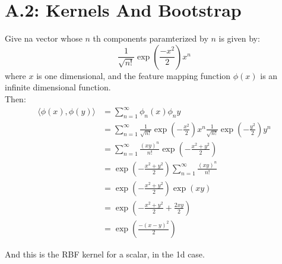 \documentclass[]{article}
\begin{document}
\section*{A.2: Kernels And Bootstrap}
    Give na vector whose $n$ th components paramterized by $n$ is given by: 
    $$
        \frac{1}{\sqrt{n!}}\exp \left(
            \frac{-x^2}{2}
        \right)x^n
    $$
    where $x$ is one dimensional, and the feature mapping function $\phi(x)$ is an infinite dimensional function. 
    \\
    Then: 
    \begin{align*}\tag{A.2.1}\label{eqn:A.2.1}
        \langle \phi(x), \phi(y)\rangle &= 
        \sum_{n = 1}^{\infty}
            \phi_n(x)\phi_n{y}
        \\
        &= 
        \sum_{n = 1}^{\infty}
            \frac{1}{\sqrt{n!}} 
            \exp \left(
                -\frac{x^2}{2}
            \right)x^n
            \frac{1}{\sqrt{n!}} 
            \exp \left(
                -\frac{y^2}{2}
            \right)y^n
        \\
        &= 
        \sum_{n = 1}^{\infty}
            \frac{(xy)^n}{n!}\exp\left(
                -\frac{x^2 + y^2}{2}
            \right)
        \\
        &= 
        \exp\left(
                -\frac{x^2 + y^2}{2}
            \right)
        \sum_{n = 1}^{\infty}
        \frac{(xy)^n}{n!}
        \\
        &= 
        \exp\left(
            - \frac{x^ 2 + y^ 2}{2}
        \right)
        \exp\left(
            xy
        \right)
        \\
        &= 
        \exp\left(
            - \frac{x^ 2 + y^ 2}{2} + \frac{2xy}{2} 
        \right)
        \\
        &= 
        \exp\left(
            \frac{-(x - y)^2}{2}
        \right)
    \end{align*}

    And this is the RBF kernel for a scalar, in the 1d case. 
    
\end{document}
